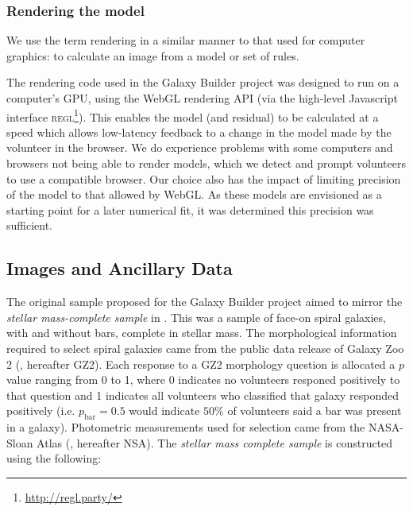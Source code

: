 \documentclass[../main.tex]{subfiles}
\begin{document}
\subsubsection{Rendering the model}

We use the term rendering in a similar manner to that used for computer graphics: to calculate an image from a model or set of rules.

The rendering code used in the Galaxy Builder project was designed to run on a computer's GPU, using the WebGL rendering API (via the high-level Javascript interface \textsc{regl}\footnote{\url{http://regl.party/}}). This enables the model (and residual) to be calculated at a speed which allows low-latency feedback to a change in the model made by the volunteer in the browser. We do experience problems with some computers and browsers not being able to render models, which we detect and prompt volunteers to use a compatible browser. Our choice also has the impact of limiting precision of the model to that allowed by WebGL. As these models are envisioned as a starting point for a later numerical fit, it was determined this precision was sufficient.

\subsection{Images and Ancillary Data}
\label{sec:data}
The original sample proposed for the Galaxy Builder project aimed to mirror the \textit{stellar mass-complete sample} in \citet{2017MNRAS.472.2263H}. This was a sample of face-on spiral galaxies, with and without bars, complete in stellar mass. The morphological information required to select spiral galaxies came from the public data release of Galaxy Zoo 2 (\citealt{Willett2013:1308.3496v2}, hereafter GZ2). Each response to a GZ2 morphology question is allocated a $p$ value ranging from 0 to 1, where 0 indicates no volunteers responed positively to that question and 1 indicates all volunteers who classified that galaxy responded positively (i.e. $p_\text{bar} = 0.5$ would indicate $50\%$ of volunteers said a bar was present in a galaxy). Photometric measurements used for selection came from the NASA-Sloan Atlas (\citealt{2011AJ....142...31B}, hereafter NSA). The \textit{stellar mass complete sample} is constructed using the following:

\end{document}
